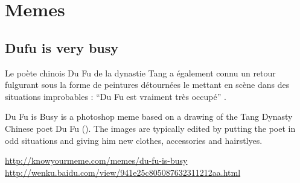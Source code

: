 \section[Memes]{Memes}
\label{sec:fullmemes}
\subsection{Dufu is very busy}



Le poète chinois Du Fu de la dynastie Tang a également connu un retour fulgurant sous la forme de peintures détournées le mettant en scène dans des situations improbables : ``Du Fu est vraiment très occupé'' . 


Du Fu is Busy is a photoshop meme based on a drawing of the Tang Dynasty Chinese poet Du Fu (). The images are typically edited by putting the poet in odd situations and giving him new clothes, accessories and hairstlyes.

\url{http://knowyourmeme.com/memes/du-fu-is-busy}
\url{http://wenku.baidu.com/view/941e25c805087632311212aa.html}

